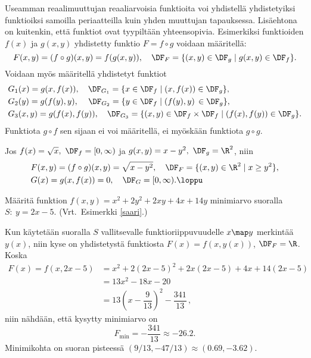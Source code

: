 Useamman reaalimuuttujan reaaliarvoisia funktioita voi yhdistellä yhdistetyiksi funktioiksi 
samoilla periaatteilla kuin yhden muuttujan tapauksessa. Lisäehtona on kuitenkin, että funktiot
ovat tyypiltään yhteensopivia. Esimerkiksi funktioiden $f(x)$ ja $g(x,y)$ yhdistetty funktio 
$F = f \circ g$  voidaan määritellä: 
\[ 
F(x,y) = (f \circ g)(x,y) = f(g(x,y)), \quad \DF_F = \{(x,y) \in \DF_g \mid g(x,y) \in \DF_f\}.
\]
Voidaan myös määritellä yhdistetyt funktiot
\begin{align*}
&G_1(x) = g(x,f(x)),   \quad \DF_{G_1} = \{x \in \DF_f \mid (x,f(x)) \in \DF_g\}, \\
&G_2(y) = g(f(y),y), \,\quad \DF_{G_2} = \{y \in \DF_f \mid (f(y),y)\,\in \DF_g\}, \\
&G_3(x,y) = g(f(x),f(y)),\quad \DF_{G_3} 
                               = \{(x,y) \in \DF_f \times \DF_f \mid (f(x),f(y)) \in \DF_g\}.
\end{align*}
Funktiota $g \circ f$ sen sijaan ei voi määritellä, ei myöskään funktiota $g \circ g$.
\begin{Exa} Jos $f(x) = \sqrt{x},\ \DF_f = [0,\infty)$ ja $g(x,y) = x-y^2,\ \DF_g = \R^2$, niin
\begin{align*}
&F(x,y) = (f \circ g)(x,y) = \sqrt{x-y^2}, \quad \DF_F = \{(x,y) \in \R^2 \mid x \ge y^2\}, \\
&G(x) = g(x,f(x)) = 0, \quad \DF_G = [0,\infty). \loppu
\end{align*} \end{Exa}
\begin{Exa} Määritä funktion $f(x,y) = x^2 + 2y^2 + 2xy + 4x + 14y$ minimiarvo suoralla 
$S:\ y = 2x-5$. (Vrt.\ Esimerkki \ref{saari}.) \end{Exa}
\ratk Kun käytetään suoralla $S$ vallitsevalle funktioriippuvuudelle $x \map y$ 
merkintää $y(x)$, niin kyse on yhdistetystä funktiosta $F(x) = f(x,y(x))$, $\DF_F = \R$.
Koska
\begin{align*}
 F(x) = f(x,2x-5) &= x^2 + 2(2x-5)^2 + 2x(2x-5) + 4x + 14(2x-5) \\[3mm]
                  &= 13x^2 - 18x - 20 \\
                  &= 13\left(x-\dfrac{9}{13}\right)^2 - \dfrac{341}{13}\,,
\end{align*}
niin nähdään, että kysytty minimiarvo on
\[ 
F_{\text{min}} = -\dfrac{341}{13} \approx -26.2. 
\]
Minimikohta on suoran pisteessä $(9/13,-47/13) \approx (0.69,-3.62)$. \loppu

